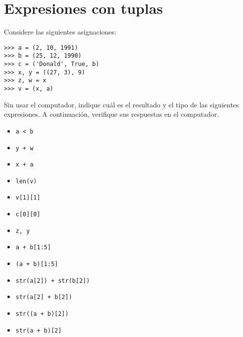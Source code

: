 \section{Expresiones con tuplas}

Considere las siguientes asignaciones:

\begin{lstlisting}
>>> a = (2, 10, 1991)
>>> b = (25, 12, 1990)
>>> c = ('Donald', True, b)
>>> x, y = ((27, 3), 9)
>>> z, w = x
>>> v = (x, a)
\end{lstlisting}

Sin usar el computador, indique cuál es el resultado y el tipo de las
siguientes expresiones. A continuación, verifique sus respuestas en el
computador.

\begin{itemize}
  \item \lstinline!a < b!
  \item \lstinline!y + w!
  \item \lstinline!x + a!
  \item \lstinline!len(v)!
  \item \lstinline!v[1][1]!
  \item \lstinline!c[0][0]!
  \item \lstinline!z, y!
  \item \lstinline!a + b[1:5]!
  \item \lstinline!(a + b)[1:5]!
  \item \lstinline!str(a[2]) + str(b[2])!
  \item \lstinline!str(a[2] + b[2])!
  \item \lstinline!str((a + b)[2])!
  \item \lstinline!str(a + b)[2]!
\end{itemize}
